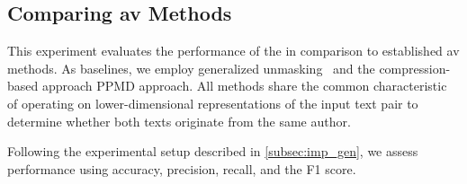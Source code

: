 \subsection{Comparing \ac{av} Methods}

This experiment evaluates the performance of the \impAppr{} in comparison to established \ac{av} methods.
As baselines, we employ generalized unmasking~\citep{bevendorff_generalizing_2019} and the compression-based approach PPMD approach.
All methods share the common characteristic of operating on lower-dimensional representations of the input text pair to determine whether both texts originate from the same author.

Following the experimental setup described in \autoref{subsec:imp_gen}, we assess performance using  accuracy, precision, recall, and the F1 score. 